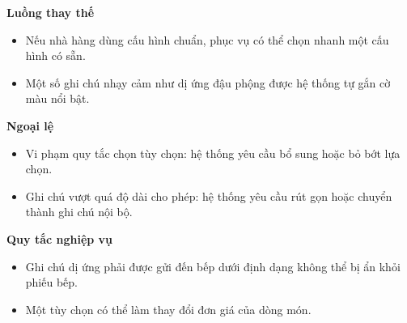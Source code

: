 \documentclass[11pt,a4paper]{article}
\begin{document}
\begin{usecasebox}[title={UC-ORD-02 --- Tùy biến món và ghi chú dị ứng}]
    \textbf{Luồng thay thế}
    \begin{itemize}[leftmargin=1.8em]
  \item Nếu nhà hàng dùng cấu hình chuẩn, phục vụ có thể chọn nhanh một cấu hình có sẵn.
  \item Một số ghi chú nhạy cảm như dị ứng đậu phộng được hệ thống tự gắn cờ màu nổi bật.
\end{itemize}

    \textbf{Ngoại lệ}
    \begin{itemize}[leftmargin=1.8em]
  \item Vi phạm quy tắc chọn tùy chọn: hệ thống yêu cầu bổ sung hoặc bỏ bớt lựa chọn.
  \item Ghi chú vượt quá độ dài cho phép: hệ thống yêu cầu rút gọn hoặc chuyển thành ghi chú nội bộ.
\end{itemize}

    \textbf{Quy tắc nghiệp vụ}
    \begin{itemize}[leftmargin=1.8em]
  \item Ghi chú dị ứng phải được gửi đến bếp dưới định dạng không thể bị ẩn khỏi phiếu bếp.
  \item Một tùy chọn có thể làm thay đổi đơn giá của dòng món.
\end{itemize}
    \end{usecasebox}
\end{document}
